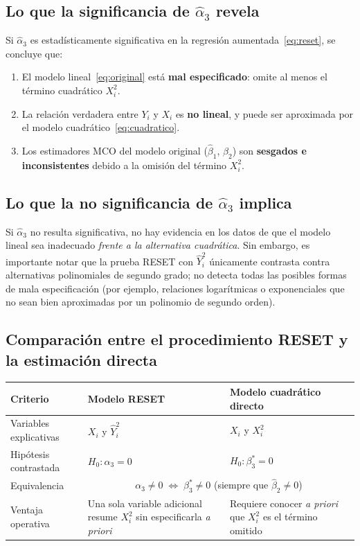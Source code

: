 \documentclass[12pt, letterpaper]{article}
\begin{document}
\subsection{Lo que la significancia de $\hat{\alpha}_3$ revela}

Si $\hat{\alpha}_3$ es estadísticamente significativa en la regresión
aumentada~\eqref{eq:reset}, se concluye que:

\begin{enumerate}[leftmargin=1.6cm, label=\textbf{\arabic*.}]
  \item El modelo lineal~\eqref{eq:original} está \textbf{mal especificado}:
    omite al menos el término cuadrático $X_i^2$.
  \item La relación verdadera entre $Y_i$ y $X_i$ es \textbf{no lineal},
    y puede ser aproximada por el modelo cuadrático~\eqref{eq:cuadratico}.
  \item Los estimadores MCO del modelo original ($\hat{\beta}_1$,
    $\hat{\beta}_2$) son \textbf{sesgados e inconsistentes} debido a la
    omisión del término $X_i^2$.
\end{enumerate}

\subsection{Lo que la no significancia de $\hat{\alpha}_3$ implica}

Si $\hat{\alpha}_3$ no resulta significativa, no hay evidencia en los
datos de que el modelo lineal sea inadecuado \emph{frente a la alternativa
cuadrática}. Sin embargo, es importante notar que la prueba RESET con
$\hat{Y}_i^2$ únicamente contrasta contra alternativas polinomiales
de segundo grado; no detecta todas las posibles formas de mala
especificación (por ejemplo, relaciones logarítmicas o exponenciales
que no sean bien aproximadas por un polinomio de segundo orden).

\subsection{Comparación entre el procedimiento RESET y la estimación directa}

\begin{center}
\renewcommand{\arraystretch}{1.4}
\small
\begin{tabular}{p{4.0cm} p{4.5cm} p{4.5cm}}
\toprule
\textbf{Criterio} & \textbf{Modelo RESET} & \textbf{Modelo cuadrático directo} \\
\midrule
Variables explicativas
  & $X_i$ y $\hat{Y}_i^2$
  & $X_i$ y $X_i^2$ \\
Hipótesis contrastada
  & $H_0: \alpha_3 = 0$
  & $H_0: \beta_3^* = 0$ \\
Equivalencia
  & \multicolumn{2}{c}{$\alpha_3 \neq 0 \;\Leftrightarrow\; \beta_3^* \neq 0$
    (siempre que $\hat{\beta}_2 \neq 0$)} \\
Ventaja operativa
  & Una sola variable adicional resume $X_i^2$ sin especificarla \textit{a priori}
  & Requiere conocer \textit{a priori} que $X_i^2$ es el término omitido \\
\bottomrule
\end{tabular}
\end{center}
\end{document}

